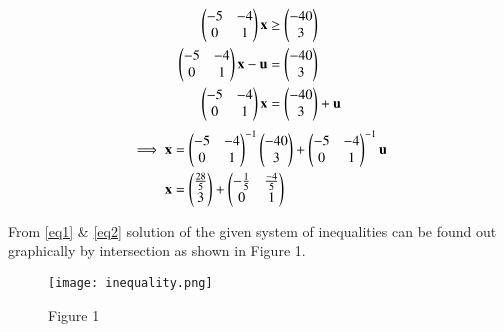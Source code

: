 \documentclass[journal,12pt,twocolumn]{IEEEtran}
\renewcommand\thesection{\arabic{section}}
\begin{document}
\begin{enumerate}[label=\thesection.\arabic*.,ref=\thesection.\theenumi]
\begin{enumerate}
\begin{align}
    \begin{pmatrix}-5&-4\\0&1\end{pmatrix}\mathbf{x}&\geq\begin{pmatrix}-40\\3\end{pmatrix}\\
    \begin{pmatrix}-5&-4\\0&1\end{pmatrix}\mathbf{x}-\mathbf{u}&=\begin{pmatrix}-40\\3\end{pmatrix}\\
    \begin{pmatrix}-5&-4\\0&1\end{pmatrix}\mathbf{x}&=\begin{pmatrix}-40\\3\end{pmatrix}+\mathbf{u}
    \end{align}
    \begin{align}
        \implies \mathbf{x}&=\begin{pmatrix}-5&-4\\0&1\end{pmatrix}^{-1}\begin{pmatrix}-40\\3\end{pmatrix}+\begin{pmatrix}-5&-4\\0&1\end{pmatrix}^{-1}\mathbf{u}\\
        \mathbf{x}&=\begin{pmatrix}\frac{28}{5}\\3\end{pmatrix}+\begin{pmatrix}-\frac{1}{5}&\frac{-4}{5}\\0&1\end{pmatrix}\label{eq2}
    \end{align}
\end{enumerate}
From \eqref{eq1} \& \eqref{eq2} solution of the given system of inequalities can be found out graphically by intersection as shown in Figure 1.


\begin{figure}[h]
\centering
\texttt{[image: inequality.png]}
\label{Fig 1.1}
\caption{Figure 1}
\end{figure}
\end{enumerate}
\end{document}
